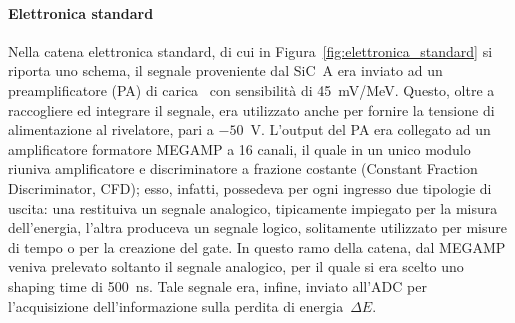 


\paragraph{Elettronica standard} 
Nella catena elettronica standard, di cui in Figura~\ref{fig:elettronica_standard} si riporta uno schema, il segnale proveniente dal SiC~A era inviato ad un preamplificatore (PA) di carica~\cite{boiano:ieee08} con sensibilità di 45~mV/MeV.
Questo, oltre a raccogliere ed integrare il segnale, era utilizzato anche per fornire la tensione di alimentazione al rivelatore, pari a $-50$~V.
L'output del PA era collegato ad un amplificatore formatore MEGAMP a 16 canali, il quale in un unico modulo riuniva amplificatore e discriminatore a frazione costante (Constant Fraction Discriminator, CFD); esso, infatti, possedeva per ogni ingresso due tipologie di uscita: una restituiva un segnale analogico, tipicamente impiegato per la misura dell'energia, l'altra produceva un segnale logico, solitamente utilizzato per misure di tempo o per la creazione del gate.
%
%
In questo ramo della catena, dal MEGAMP veniva prelevato soltanto il segnale analogico, per il quale si era scelto uno shaping time di 500~ns.
Tale segnale era, infine, inviato all'ADC per l'acquisizione dell'informazione sulla perdita di energia~$\Delta E$.
%

